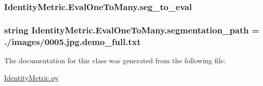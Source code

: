 \subsubsection[{seg\+\_\+to\+\_\+eval}]{\setlength{\rightskip}{0pt plus 5cm}Identity\+Metric.\+Eval\+One\+To\+Many.\+seg\+\_\+to\+\_\+eval}\label{class_identity_metric_1_1_eval_one_to_many_a54f875567b8192cb085bfb50ea56681c}
\hypertarget{class_identity_metric_1_1_eval_one_to_many_a570ec5855994d7a62b350f86f7879dff}{}
\subsubsection[{segmentation\+\_\+path}]{\setlength{\rightskip}{0pt plus 5cm}string Identity\+Metric.\+Eval\+One\+To\+Many.\+segmentation\+\_\+path = \textquotesingle{}./images/0005.jpg.\+demo\+\_\+full.\+txt\textquotesingle{}\hspace{0.3cm}{\ttfamily [static]}}\label{class_identity_metric_1_1_eval_one_to_many_a570ec5855994d7a62b350f86f7879dff}


The documentation for this class was generated from the following file\+:\begin{DoxyCompactItemize}
\item 
\hyperlink{_identity_metric_8py}{Identity\+Metric.\+py}\end{DoxyCompactItemize}
